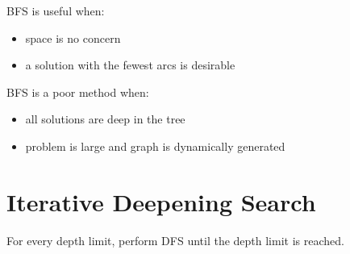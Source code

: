 \documentclass[11pt]{article}
\begin{document}
BFS is useful when:
\begin{itemize}
\item space is no concern
\item a solution with the fewest arcs is desirable
\end{itemize}

BFS is a poor method when:
\begin{itemize}
\item all solutions are deep in the tree
\item problem is large and graph is dynamically generated
\end{itemize}
\section{Iterative Deepening Search}
\label{sec:org065ebf6}
For every depth limit, perform DFS until the depth limit is reached.
\end{document}
